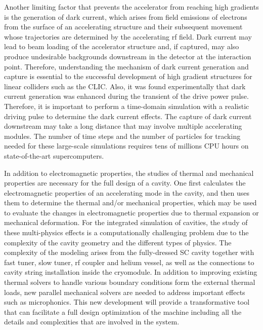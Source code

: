 Another limiting factor that prevents the accelerator from reaching
high gradients is the generation of dark current, which arises
from field emissions of electrons from the surface of an
accelerating structure and their subsequent movement whose
trajectories are determined by the accelerating rf field. Dark
current may lead to beam loading of the accelerator structure
and, if captured, may also produce undesirable backgrounds
downstream in the detector at the interaction point. Therefore,
understanding the mechanism of dark current generation and
capture is essential to the successful development of high
gradient structures for linear colliders such as the CLIC. Also,
it was found experimentally that dark current generation was
enhanced during the transient of the drive power pulse.
Therefore, it is important to perform a time-domain simulation
with a realistic driving pulse to determine the dark current
effects. The capture of dark current downstream may take a long
distance that may involve multiple accelerating modules. The
number of time steps and the number of particles for tracking
needed for these large-scale simulations requires tens of
millions CPU hours on state-of-the-art supercomputers.

In addition to electromagnetic properties, the
studies of thermal and mechanical properties are necessary for
the full design of a cavity. One first calculates the
electromagnetic properties of an accelerating mode in the cavity,
and then uses them to determine the thermal and/or mechanical
properties, which may be used to evaluate the changes in
electromagnetic properties due to thermal expansion or mechanical
deformation. For the integrated simulation of cavities, the study
of these multi-physics effects is a computationally challenging
problem due to the complexity of the cavity geometry and the
different types of physics. The complexity of the modeling arises from 
the fully-dressed SC
cavity together with fast tuner, slow tuner, rf coupler and
helium vessel, as well as the connections to cavity string
installation inside the cryomodule. In addition to improving
existing thermal solvers to handle various boundary conditions
form the external thermal loads, new parallel mechanical solvers
are needed to address important effects such as microphonics. This
new development will provide a transformative tool that can
facilitate a full design optimization of the machine including
all the details and complexities that are involved in the system.



